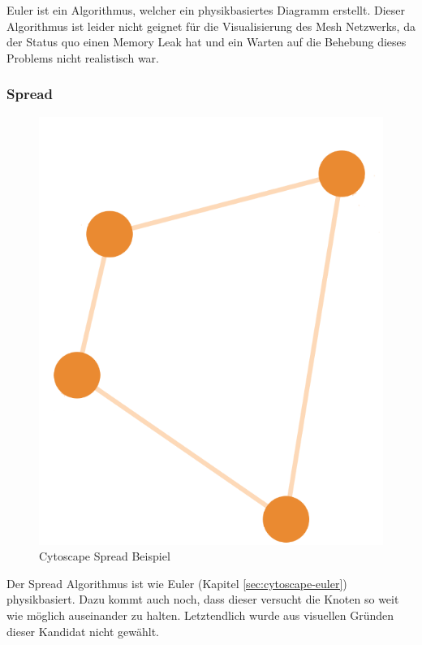 Euler ist ein Algorithmus, welcher ein physikbasiertes Diagramm erstellt.
Dieser Algorithmus ist leider nicht geignet für die Visualisierung des Mesh Netzwerks, da der Status quo einen Memory Leak hat und ein Warten auf die Behebung dieses Problems nicht realistisch war.

\subsubsection{Spread}\label{sec:cytoscape-spread}

\begin{figure}[H] 
    \begin{center}
        \includegraphics[scale=0.7]{images/cytoscape-spread-example.png}
        \caption{Cytoscape Spread Beispiel \cite{cytoscape_spread}}
        \label{abb:cytoscape-spread-example}
    \end{center}    
\end{figure}

Der Spread Algorithmus ist wie Euler (Kapitel \ref{sec:cytoscape-euler}) physikbasiert. Dazu kommt auch noch, dass dieser versucht die Knoten so weit wie möglich auseinander zu halten. Letztendlich wurde aus visuellen Gründen dieser Kandidat nicht gewählt.

